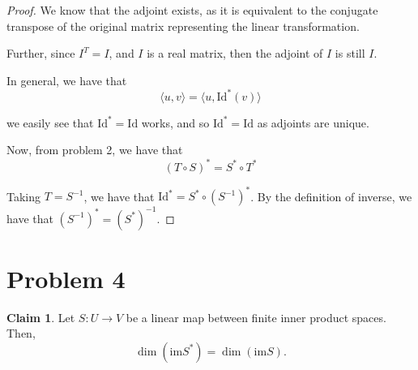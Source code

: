 \documentclass[12pt,letterpaper]{article}
\theoremstyle{definition}
\newtheorem*{claim}{Claim}
\newcommand{\id}{\mathrm{Id}}
\newcommand{\im}{\mathrm{im}}
\begin{document}
\begin{proof}

  We know that the adjoint exists, as it is equivalent to the conjugate
  transpose of the original matrix representing the linear transformation.

  Further, since $I^T = I$, and $I$ is a real matrix, then the adjoint of $I$ is
  still $I$.

  In general, we have that
  \[
    \langle u, v  \rangle = \langle u, \id^*(v) \rangle
  \]

  we easily see that $\id^* = \id$ works, and so $\id^* = \id$ as adjoints are unique.


  Now, from problem 2, we have that
  \[
    (T \circ S)^*= S^* \circ T^*
  \]

  Taking $T = S^{-1}$, we have that $\id^* = S^* \circ (S^{-1})^*$. By the
  definition of inverse, we have that $(S^{-1})^* = (S^*)^{-1}$.
\end{proof}

\section*{Problem 4}

\begin{claim}
  Let $S: U \rightarrow V$ be a linear map between finite inner product spaces.
  Then,
  \[
    \dim(\im S^*) = \dim(\im S).
  \]
\end{claim}
\end{document}
